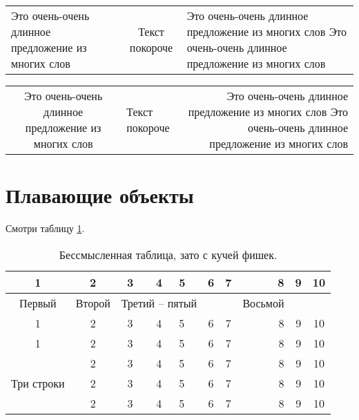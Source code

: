 \documentclass[a4paper,14pt]{extarticle}
\begin{document}
\begin{tabularx}{\textwidth}{X|c|X}
	\hline
	Это очень-очень длинное предложение из многих слов & Текст покороче & Это очень-очень длинное предложение из многих слов Это очень-очень длинное предложение из многих слов
\end{tabularx}


\begin{tabulary}{\textwidth}{C|J|R}
	\hline
	Это очень-очень длинное предложение из многих слов & Текст покороче & Это очень-очень длинное предложение из многих слов Это очень-очень длинное предложение из многих слов
\end{tabulary}

\section{Плавающие объекты}

Смотри таблицу \ref{tab:mytab}.

\begin{table}[H]
	\begin{center}
		\caption[Заголовок для списка таблиц]{Бессмысленная таблица, зато с кучей фишек.}\label{tab:mytab}
		\begin{tabular}{|c|c|c|c||l|c|c|r|c|c|}
			\hline
			1 & 2 & 3 & 4 & 5 & 6 & 7 & 8 & 9 & 10 \\ \hline
			Первый & Второй & \multicolumn{3}{|c|}{Третий -- пятый} &   &  & Восьмой &   &  \\ 
			\cline{1-7} \cline{9-10}
			1 & 2 & 3 & 4 & 5 & 6 & 7 & 8 & 9 & 10 \\ \hline \hline
			1 & 2 & 3 & 4 & 5 & 6 & 7 & 8 & 9 & 10 \\ \hline
			\multirow{3}{*}{Три строки}  & 2 & 3 & 4 & 5 & 6 & 7 & 8 & 9 & 10 \\ \cline{2-10}
			& 2 & 3 & 4 & 5 & 6 & 7 & 8 & 9 & 10 \\ \cline{2-10}
			& 2 & 3 & 4 & 5 & 6 & 7 & 8 & 9 & 10 \\ \hline
		\end{tabular}
	\end{center}
\end{table}
\end{document}
